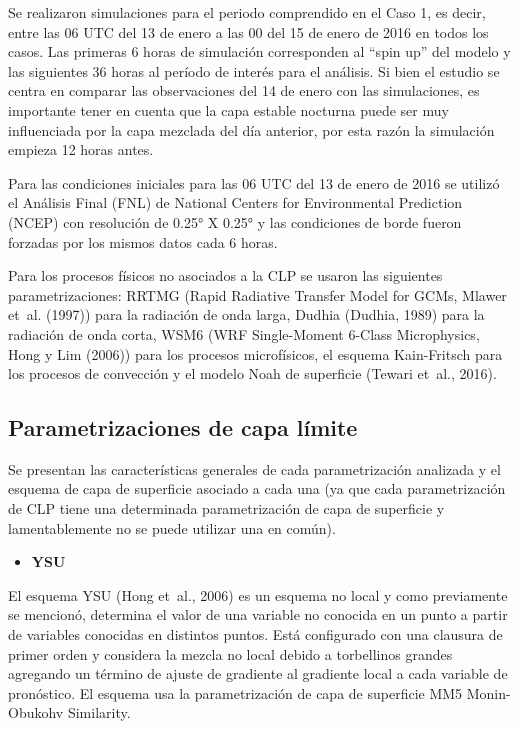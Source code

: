 \documentclass[12pt,spanish,oneside, a4paper]{book}
\providecommand{\tightlist}{%
  \setlength{\itemsep}{0pt}\setlength{\parskip}{0pt}}
\begin{document}
Se realizaron simulaciones para el periodo comprendido en el Caso 1, es
decir, entre las 06 UTC del 13 de enero a las 00 del 15 de enero de 2016
en todos los casos. Las primeras 6 horas de simulación corresponden al
``spin up'' del modelo y las siguientes 36 horas al período de interés
para el análisis. Si bien el estudio se centra en comparar las
observaciones del 14 de enero con las simulaciones, es importante tener
en cuenta que la capa estable nocturna puede ser muy influenciada por la
capa mezclada del día anterior, por esta razón la simulación empieza 12
horas antes.

Para las condiciones iniciales para las 06 UTC del 13 de enero de 2016
se utilizó el Análisis Final (FNL) de National Centers for Environmental
Prediction (NCEP) con resolución de 0.25° X 0.25° y las condiciones de
borde fueron forzadas por los mismos datos cada 6 horas.

Para los procesos físicos no asociados a la CLP se usaron las siguientes
parametrizaciones: RRTMG (Rapid Radiative Transfer Model for GCMs,
Mlawer et~al. (1997)) para la radiación de onda larga, Dudhia (Dudhia,
1989) para la radiación de onda corta, WSM6 (WRF Single-Moment 6-Class
Microphysics, Hong y Lim (2006)) para los procesos microfísicos, el
esquema Kain-Fritsch para los procesos de convección y el modelo Noah de
superficie (Tewari et~al., 2016).

\subsection{Parametrizaciones de capa
límite}\label{parametrizaciones-de-capa-limite}

Se presentan las características generales de cada parametrización
analizada y el esquema de capa de superficie asociado a cada una (ya que
cada parametrización de CLP tiene una determinada parametrización de
capa de superficie y lamentablemente no se puede utilizar una en común).

\begin{itemize}
\tightlist
\item
  \textbf{YSU}
\end{itemize}

El esquema YSU (Hong et~al., 2006) es un esquema no local y como
previamente se mencionó, determina el valor de una variable no conocida
en un punto a partir de variables conocidas en distintos puntos. Está
configurado con una clausura de primer orden y considera la mezcla no
local debido a torbellinos grandes agregando un término de ajuste de
gradiente al gradiente local a cada variable de pronóstico. El esquema
usa la parametrización de capa de superficie MM5 Monin-Obukohv
Similarity.
\end{document}
